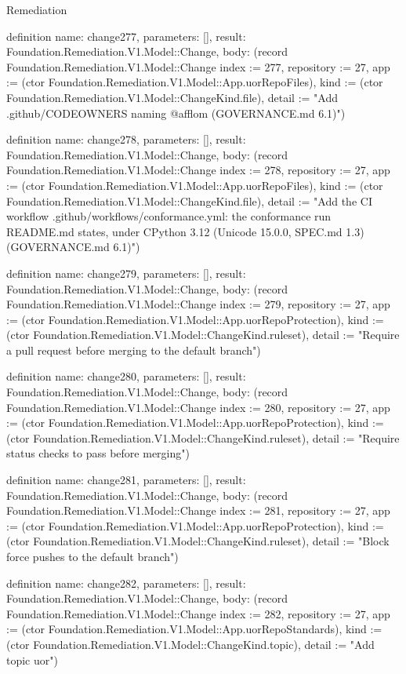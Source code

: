 \begin{lexlean}{Remediation}
\begin{semanticmodule}
definition{
  name: change277,
  parameters: [],
  result: Foundation.Remediation.V1.Model::Change,
  body: (record Foundation.Remediation.V1.Model::Change {index := 277, repository := 27, app := (ctor Foundation.Remediation.V1.Model::App.uorRepoFiles), kind := (ctor Foundation.Remediation.V1.Model::ChangeKind.file), detail := "Add .github/CODEOWNERS naming @afflom (GOVERNANCE.md 6.1)"})
}

definition{
  name: change278,
  parameters: [],
  result: Foundation.Remediation.V1.Model::Change,
  body: (record Foundation.Remediation.V1.Model::Change {index := 278, repository := 27, app := (ctor Foundation.Remediation.V1.Model::App.uorRepoFiles), kind := (ctor Foundation.Remediation.V1.Model::ChangeKind.file), detail := "Add the CI workflow .github/workflows/conformance.yml: the conformance run README.md states, under CPython 3.12 (Unicode 15.0.0, SPEC.md 1.3) (GOVERNANCE.md 6.1)"})
}

definition{
  name: change279,
  parameters: [],
  result: Foundation.Remediation.V1.Model::Change,
  body: (record Foundation.Remediation.V1.Model::Change {index := 279, repository := 27, app := (ctor Foundation.Remediation.V1.Model::App.uorRepoProtection), kind := (ctor Foundation.Remediation.V1.Model::ChangeKind.ruleset), detail := "Require a pull request before merging to the default branch"})
}

definition{
  name: change280,
  parameters: [],
  result: Foundation.Remediation.V1.Model::Change,
  body: (record Foundation.Remediation.V1.Model::Change {index := 280, repository := 27, app := (ctor Foundation.Remediation.V1.Model::App.uorRepoProtection), kind := (ctor Foundation.Remediation.V1.Model::ChangeKind.ruleset), detail := "Require status checks to pass before merging"})
}

definition{
  name: change281,
  parameters: [],
  result: Foundation.Remediation.V1.Model::Change,
  body: (record Foundation.Remediation.V1.Model::Change {index := 281, repository := 27, app := (ctor Foundation.Remediation.V1.Model::App.uorRepoProtection), kind := (ctor Foundation.Remediation.V1.Model::ChangeKind.ruleset), detail := "Block force pushes to the default branch"})
}

definition{
  name: change282,
  parameters: [],
  result: Foundation.Remediation.V1.Model::Change,
  body: (record Foundation.Remediation.V1.Model::Change {index := 282, repository := 27, app := (ctor Foundation.Remediation.V1.Model::App.uorRepoStandards), kind := (ctor Foundation.Remediation.V1.Model::ChangeKind.topic), detail := "Add topic uor"})
}


\end{semanticmodule}
\end{lexlean}
